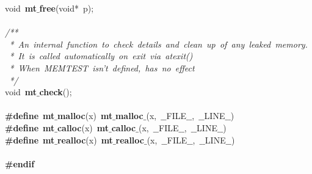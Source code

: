 \documentclass{article}
\begin{document}
\mbox{}void\ \textbf{mt$\_$free}(void*\ p); \\
\mbox{} \\
\mbox{}\textit{/**} \\
\mbox{}\textit{\ *\ An\ internal\ function\ to\ check\ details\ and\ clean\ up\ of\ any\ leaked\ memory.} \\
\mbox{}\textit{\ *\ It\ is\ called\ automatically\ on\ exit\ via\ atexit()} \\
\mbox{}\textit{\ *\ When\ MEMTEST\ isn't\ defined,\ has\ no\ effect} \\
\mbox{}\textit{\ */} \\
\mbox{}void\ \textbf{mt$\_$check}(); \\
\mbox{} \\
\mbox{}\textbf{\#define}\ \textbf{mt$\_$malloc}(x)\ \textbf{mt$\_$malloc$\_$}(x,\ $\_$$\_$FILE$\_$$\_$,\ $\_$$\_$LINE$\_$$\_$) \\
\mbox{}\textbf{\#define}\ \textbf{mt$\_$calloc}(x)\ \textbf{mt$\_$calloc$\_$}(x,\ $\_$$\_$FILE$\_$$\_$,\ $\_$$\_$LINE$\_$$\_$) \\
\mbox{}\textbf{\#define}\ \textbf{mt$\_$realloc}(x)\ \textbf{mt$\_$realloc$\_$}(x,\ $\_$$\_$FILE$\_$$\_$,\ $\_$$\_$LINE$\_$$\_$) \\
\mbox{} \\
\mbox{}\textbf{\#endif} \\
\mbox{}
\end{document}
